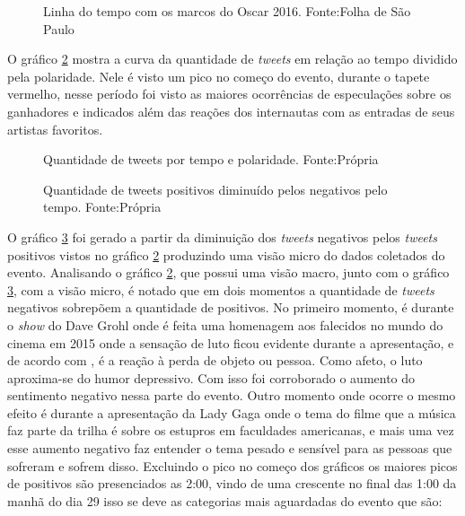 \begin{figure}[H]
	\centering{}
	\caption{Linha do tempo com os marcos do Oscar 2016. Fonte:Folha de São Paulo}
	\label{time}
\end{figure}
O gráfico \ref{qtd} mostra a curva da quantidade de \textit{tweets} em relação ao tempo  dividido pela polaridade. Nele é visto um pico  no começo do evento, durante o tapete vermelho, nesse período foi visto as maiores ocorrências de especulações sobre os ganhadores e indicados além das reações dos internautas com as entradas de seus artistas favoritos.

\begin{figure}[H]
	\centering{}
	\caption{Quantidade de tweets por tempo e polaridade. Fonte:Própria}
	\label{qtd}
\end{figure}

\begin{figure}[H]
	\centering{}
	\caption{Quantidade de tweets positivos diminuído pelos negativos pelo tempo. Fonte:Própria}
	\label{qtdnegpos}
\end{figure}

O gráfico \ref{qtdnegpos} foi gerado a partir da diminuição dos \textit{tweets} negativos pelos \textit{tweets} positivos vistos no gráfico \ref{qtd} produzindo uma visão micro do dados coletados do evento. Analisando o gráfico \ref{qtd}, que possui uma visão macro, junto com o gráfico \ref{qtdnegpos}, com a visão micro, é notado que em dois momentos a quantidade de \textit{tweets} negativos sobrepõem a quantidade de positivos. No primeiro momento, é durante o \textit{show} do Dave Grohl onde é feita uma homenagem aos falecidos no mundo do cinema em 2015 onde a sensação de luto ficou evidente durante a apresentação, e de acordo com \cite{freud1908conferencias}, é a reação à perda de objeto ou pessoa. Como afeto, o luto aproxima-se do humor depressivo. Com isso foi corroborado o aumento do sentimento negativo nessa parte do evento. Outro momento onde ocorre o mesmo efeito é durante a apresentação da Lady Gaga onde o tema do filme que a  música faz parte da trilha é sobre os estupros em faculdades americanas, e mais uma vez esse aumento negativo faz entender o tema pesado e sensível para as pessoas que sofreram e sofrem disso. Excluindo o pico no começo dos gráficos os maiores picos de positivos são presenciados as 2:00, vindo de uma crescente no final das 1:00 da manhã do dia 29 isso se deve as categorias mais aguardadas do evento que são:

